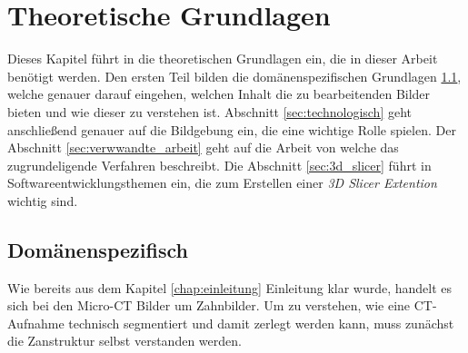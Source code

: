 \chapter{Theoretische Grundlagen}
\label{chap:theoretische_grundlagen} Dieses Kapitel führt in die theoretischen Grundlagen
ein, die in dieser Arbeit benötigt werden. Den ersten Teil bilden die domänenspezifischen
Grundlagen \ref{sec:domänenspezifisch}, welche genauer darauf eingehen, welchen Inhalt
die zu bearbeitenden Bilder bieten und wie dieser zu verstehen ist. Abschnitt
\ref{sec:technologisch} geht anschließend genauer auf die Bildgebung ein, die eine
wichtige Rolle spielen. Der Abschnitt \ref{sec:verwwandte_arbeit} geht auf die
Arbeit von \citet{hoffmann2020} welche das zugrundeligende Verfahren beschreibt.
Die Abschnitt \ref{sec:3d_slicer} führt in Softwareentwicklungsthemen ein, die zum
Erstellen einer \textit{3D Slicer Extention} wichtig sind.

\section{Domänenspezifisch}
\label{sec:domänenspezifisch} Wie bereits aus dem Kapitel \ref{chap:einleitung}
Einleitung klar wurde, handelt es sich bei den Micro-CT Bilder um Zahnbilder. Um
zu verstehen, wie eine CT-Aufnahme technisch segmentiert und damit zerlegt werden
kann, muss zunächst die Zanstruktur selbst verstanden werden.

